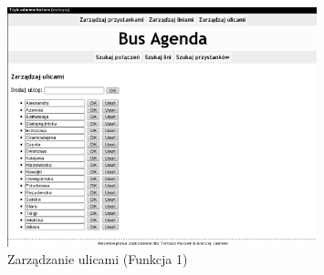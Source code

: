 \begin{figure}[!htp]
    \centering
    \includegraphics[width=0.8\textwidth]{./img/screens/manageStreets_main.eps}
    \caption{Zarządzanie ulicami (Funkcja 1)}
    \label{fig:streetMgt}
\end{figure}